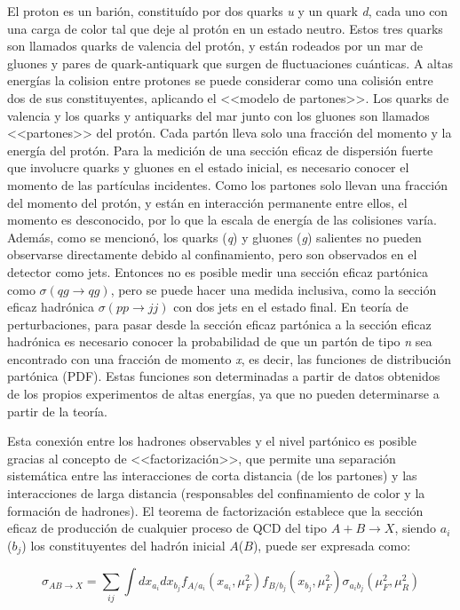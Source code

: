 El proton es un barión, constituído por dos quarks \textit{u} y un quark \textit{d}, cada uno con una carga de color tal que deje al protón en un estado neutro. Estos tres quarks son llamados quarks de valencia del protón, y están rodeados por un mar de gluones y pares de quark-antiquark que surgen de fluctuaciones cuánticas. A altas energías la colision entre protones se puede considerar como una colisión entre dos de sus constituyentes, aplicando el <<modelo de partones>>. Los quarks de valencia y los quarks y antiquarks del mar junto con los gluones son llamados <<partones>> del protón. Cada partón lleva solo una fracción del momento y la energía del protón. Para la medición de una sección eficaz de dispersión fuerte que involucre quarks y gluones en el estado inicial, es necesario conocer el momento de las partículas incidentes. Como los partones solo llevan una fracción del momento del protón, y están en interacción permanente entre ellos, el momento es desconocido, por lo que la escala de energía de las colisiones varía. Además, como se mencionó, los quarks (\textit{q}) y gluones (\textit{g}) salientes no pueden observarse directamente debido al confinamiento, pero son observados en el detector como jets. Entonces no es posible medir una sección eficaz partónica como $\sigma(qg \rightarrow qg)$, pero se puede hacer una medida inclusiva, como la sección eficaz hadrónica $\sigma(pp \rightarrow jj)$ con dos jets en el estado final. En teoría de perturbaciones, para pasar desde la sección eficaz partónica a la sección eficaz hadrónica es necesario conocer la probabilidad de que un partón de tipo \textit{n} sea encontrado con una fracción de momento \textit{x}, es decir, las funciones de distribución partónica (PDF). Estas funciones son determinadas a partir de datos obtenidos de los propios experimentos de altas energías, ya que no pueden determinarse a partir de la teoría. 

Esta conexión entre los hadrones observables y el nivel partónico es posible gracias al concepto de <<factorización>>, que permite una separación sistemática entre las interacciones de corta distancia (de los partones) y las interacciones de larga distancia (responsables del confinamiento de color y la formación de hadrones). El teorema de factorización establece que la sección eficaz de producción de cualquier proceso de QCD del tipo $A + B \rightarrow X$, siendo $a_{i}$ ($b_{j}$) los constituyentes del hadrón inicial $A$($B$), puede ser expresada como: 

\begin{equation}
\sigma_{AB\rightarrow X}=\sum_{ij}\int dx_{a_{i}}dx_{b_{j}}f_{A/a_{i}}(x_{a_{i}},\mu_{F}^{2})f_{B/b_{j}}(x_{b_{j}},\mu_{F}^{2})\sigma_{a_{i}b_{j}}(\mu_{F}^{2},\mu_{R}^{2})
\end{equation}

